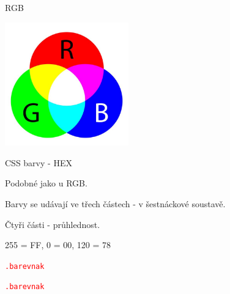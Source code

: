 \documentclass[aspectratio=1610]{beamer}
\begin{document}
\begin{frame}{RGB}
    \begin{center}
        \includegraphics[width=0.4\textwidth]{img/rgb.jpg}
    \end{center}
\end{frame}

\begin{frame}{CSS barvy - HEX}
    \begin{cardTiny}
        \begin{flushleft}
            Podobné jako u RGB.

            Barvy se udávají ve třech částech - v šestnáckové soustavě.

            Čtyři části - průhlednost.

            255 = FF, 0 = 00, 120 = 78

            \begin{alltt}
                \textcolor{red}{.barevnak} \string{\\
                    \textcolor{blue}{color}: \textcolor{orange}{\#FF0000};\\
                \string}
            \end{alltt}

            \begin{alltt}
                \textcolor{red}{.barevnak} \string{\\
                    \textcolor{blue}{color}: \textcolor{orange}{\#FF7878F0};\\
                \string}
            \end{alltt}
        \end{flushleft}
    \end{cardTiny}
\end{frame}
\end{document}
